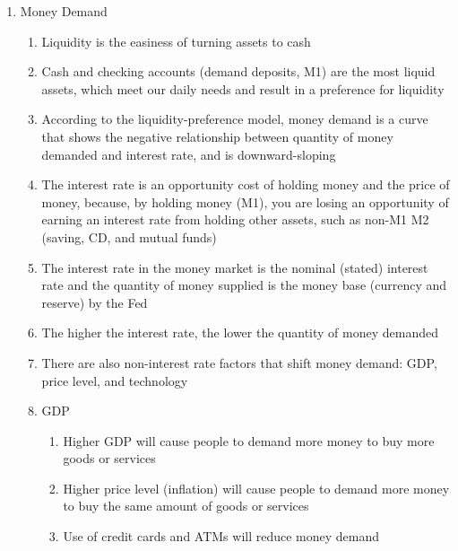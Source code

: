\documentclass[12pt]{article}
\begin{document}
\begin{enumerate}
\begin{enumerate}
        \end{enumerate}

      \item Money Demand

        \begin{enumerate}

          \item Liquidity is the easiness of turning assets to cash

          \item Cash and checking accounts (demand deposits, M1) are the most liquid assets, which meet our daily needs and result in a preference for liquidity

          \item According to the liquidity-preference model, money demand is a curve that shows the negative relationship between quantity of money demanded and interest rate, and is downward-sloping

          \item The interest rate is an opportunity cost of holding money and the price of money, because, by holding money (M1), you are losing an opportunity of earning an interest rate from holding other assets, such as non-M1 M2 (saving, CD, and mutual funds)

          \item The interest rate in the money market is the nominal (stated) interest rate and the quantity of money supplied is the money base (currency and reserve) by the Fed

          \item The higher the interest rate, the lower the quantity of money demanded

          \item There are also non-interest rate factors that shift money demand: GDP, price level, and technology

          \item GDP

            \begin{enumerate}

              \item Higher GDP will cause people to demand more money to buy more goods or services

              \item Higher price level (inflation) will cause people to demand more money to buy the same amount of goods or services

              \item Use of credit cards and ATMs will reduce money demand


\end{enumerate}
\end{enumerate}
\end{enumerate}
\end{document}
